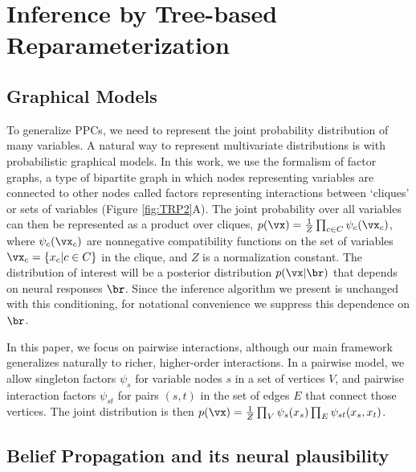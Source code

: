 \documentclass{article}
\begin{document}
\section{Inference by Tree-based Reparameterization}
\label{TRP}

\subsection{Graphical Models}
\label{GMs}

To generalize PPCs, we need to represent the joint probability distribution of many variables. A natural way to represent multivariate distributions is with probabilistic graphical models. In this work, we use the formalism of factor graphs, a type of bipartite graph in which nodes representing variables are connected to other nodes called factors representing interactions between `cliques' or sets of variables (Figure \ref{fig:TRP2}A). The joint probability over all variables can then be represented as a product over cliques, $p(\vx) = \frac{1}{Z}\prod_{c\in C} \psi_c(\vx_c)$, where $\psi_c(\vx_c)$ are nonnegative compatibility functions on the set of variables $\vx_c=\{x_c|c\in C\}$ in the clique, and $Z$ is a normalization constant. The distribution of interest will be a posterior distribution $p(\vx|\br)$ that depends on neural responses $\br$. Since the inference algorithm we present is unchanged with this conditioning, for notational convenience we suppress this dependence on $\br$.

In this paper, we focus on pairwise interactions, although our main framework generalizes naturally to richer, higher-order interactions. In a pairwise model, we allow singleton factors $\psi_s$ for variable nodes $s$ in a set of vertices $V$, and pairwise interaction factors $\psi_{st}$ for pairs $(s,t)$ in the set of edges $E$ that connect those vertices. The joint distribution is then $p(\vx) = \frac{1}{Z}\prod_{V} \psi_s(x_s)\prod_{E}\psi_{st}(x_s,x_t)$.


\subsection{Belief Propagation and its neural plausibility}
\label{BP}
\end{document}
